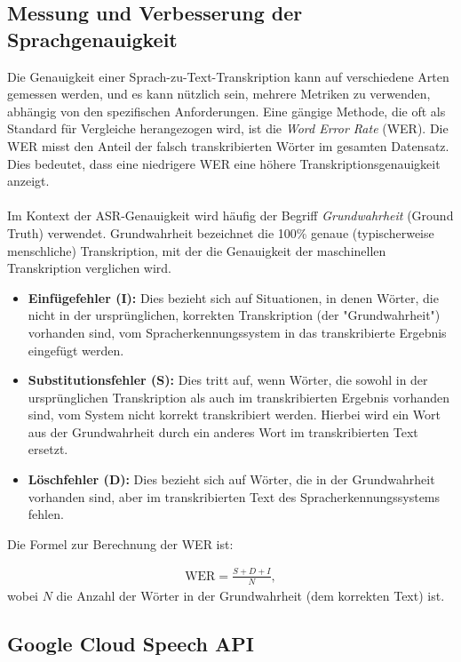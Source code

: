 \documentclass[12pt,a4paper]{article}
\begin{document}
\subsection{Messung und Verbesserung der Sprachgenauigkeit}

Die Genauigkeit einer Sprach-zu-Text-Transkription kann auf verschiedene Arten gemessen werden, und es kann nützlich sein, mehrere Metriken zu verwenden, abhängig von den spezifischen Anforderungen. Eine gängige Methode, die oft als Standard für Vergleiche herangezogen wird, ist die \textit{Word Error Rate} (WER). Die WER misst den Anteil der falsch transkribierten Wörter im gesamten Datensatz. Dies bedeutet, dass eine niedrigere WER eine höhere Transkriptionsgenauigkeit anzeigt.
\\ \\
Im Kontext der ASR-Genauigkeit wird häufig der Begriff \textit{Grundwahrheit} (Ground Truth) verwendet. Grundwahrheit bezeichnet die 100\% genaue (typischerweise menschliche) Transkription, mit der die Genauigkeit der maschinellen Transkription verglichen wird.

\begin{itemize}
	\item \textbf{Einfügefehler (I):} Dies bezieht sich auf Situationen, in denen Wörter, die nicht in der ursprünglichen, korrekten Transkription (der "Grundwahrheit") vorhanden sind, vom Spracherkennungssystem in das transkribierte Ergebnis eingefügt werden.
	\item \textbf{Substitutionsfehler (S):} Dies tritt auf, wenn Wörter, die sowohl in der ursprünglichen Transkription als auch im transkribierten Ergebnis vorhanden sind, vom System nicht korrekt transkribiert werden. Hierbei wird ein Wort aus der Grundwahrheit durch ein anderes Wort im transkribierten Text ersetzt.
	\item \textbf{Löschfehler (D):} Dies bezieht sich auf Wörter, die in der Grundwahrheit vorhanden sind, aber im transkribierten Text des Spracherkennungssystems fehlen.
\end{itemize}

Die Formel zur Berechnung der WER ist:

\begin{align}
\text{WER} = \frac{S + D + I}{N},
\end{align}
wobei \(N\) die Anzahl der Wörter in der Grundwahrheit (dem korrekten Text) ist.



\subsection{Google Cloud Speech API}
\end{document}
